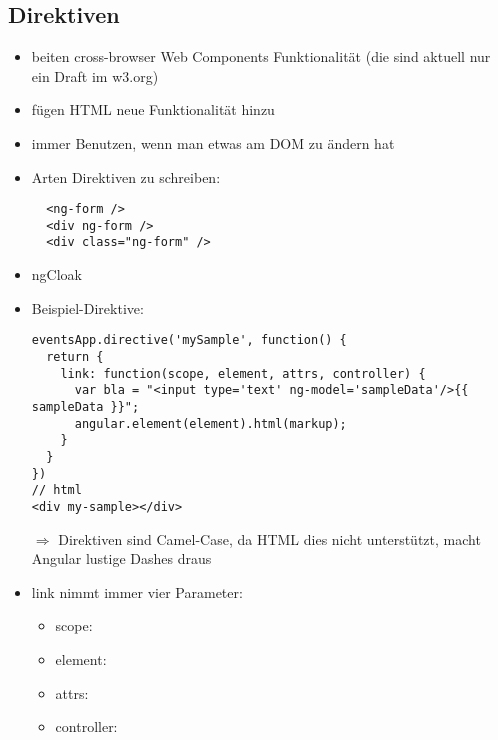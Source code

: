 \subsection{Direktiven}
\begin{itemize}
  \item beiten cross-browser Web Components Funktionalität (die sind aktuell nur ein Draft im w3.org)
  \item fügen HTML neue Funktionalität hinzu
  \item immer Benutzen, wenn man etwas am DOM zu ändern hat
  \item Arten Direktiven zu schreiben:
    \begin{verbatim}
  <ng-form />
  <div ng-form />
  <div class="ng-form" />
    \end{verbatim}
  \item ngCloak
  \item Beispiel-Direktive:
    \begin{verbatim}
eventsApp.directive('mySample', function() {
  return {
    link: function(scope, element, attrs, controller) {
      var bla = "<input type='text' ng-model='sampleData'/>{{ sampleData }}";
      angular.element(element).html(markup);
    }
  }
})
// html
<div my-sample></div>
    \end{verbatim}
    $\Rightarrow$  Direktiven sind Camel-Case, da HTML dies nicht unterstützt, macht Angular lustige
    Dashes draus
  \item link nimmt immer vier Parameter:
    \begin{itemize}
      \item scope:
      \item element:
      \item attrs:
      \item controller:
    \end{itemize}
\end{itemize}


